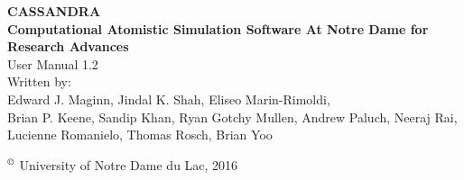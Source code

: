 \begin{center}
\vspace*{2 in}
{\huge{\bf CASSANDRA} }\\ 
\vspace{0.5in}
{\huge { \bf  Computational Atomistic Simulation Software At Notre Dame for Research Advances}} \\
\vspace{1 in}
User Manual 1.2 \\ 
\vspace{0.2in}
Written by: \\ 
\vspace{0.2in}
Edward J. Maginn, Jindal K. Shah, Eliseo Marin-Rimoldi, \\
Brian P. Keene, Sandip Khan, Ryan Gotchy Mullen, Andrew Paluch,
Neeraj Rai, Lucienne Romanielo, Thomas Rosch, Brian Yoo
\end{center}
\vspace{1.3in}
$^\copyright$ University of Notre Dame du Lac, 2016
